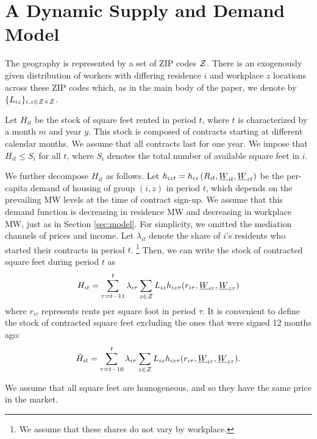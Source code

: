 
\section{A Dynamic Supply and Demand Model}\label{sec:dyn_theory_model}

The geography is represented by a set of ZIP codes $\mathcal{Z}$.
There is an exogenously given distribution of workers with differing 
residence $i$ and workplace $z$ locations across these ZIP codes which,
as in the main body of the paper, we denote by $\{L_{iz}\}_{i,z\in\mathcal{Z}\times\mathcal{Z}}$.

Let $H_{it}$ be the stock of square feet rented in period $t$, where $t$ is 
characterized by a month $m$ and year $y$.
This stock is composed of contracts starting at different calendar months. 
We assume that all contracts last for one year.
We impose that $H_{it} \leq S_i$ for all $t$, 
where $S_i$ denotes the total number of available square feet in $i$.

We further decompose $H_{it}$ as follows.
Let $h_{izt} = h_{iz}\left(R_{it}, \underline{W}_{it}, \underline{W}_{zt}\right)$ be the 
per-capita demand of housing of group $(i,z)$ in period $t$,
which depends on the prevailing MW levels at the time of contract sign-up.
We assume that this demand function is decreasing in residence MW and decreasing
in workplace MW, just as in Section \ref{sec:model}.
For simplicity, we omitted the mediation channels of prices and income.
Let $\lambda_{it}$ denote the share of $i$'s residents who started their contracts 
in period $t$.%
\footnote{We assume that these shares do not vary by workplace.}
Then, we can write the stock of contracted square feet during period $t$ as
$$
H_{it} = \sum_{\tau = t - 11}^{t} \lambda_{i\tau} \sum_{z\in\mathcal{Z}} L_{iz} 
h_{iz\tau} (r_{i\tau}, \underline{W}_{i\tau}, \underline{W}_{z\tau})
$$
where 
$r_{i\tau}$ represents rents per square foot in period $\tau$.
It is convenient to define the stock of contracted square feet excluding the ones 
that were signed 12 months ago:
$$
\tilde H_{it} = \sum_{\tau = t - 10}^{t} \lambda_{i\tau} \sum_{z\in\mathcal{Z}} L_{iz} 
h_{iz\tau} (r_{i\tau}, \underline{W}_{i\tau}, \underline{W}_{z\tau}) .
$$

We assume that all square feet are homogeneous, and so they have the same price 
in the market.

